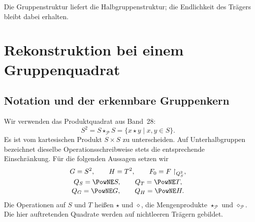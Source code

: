 \documentclass[main.tex]{subfiles}
\begin{document}


\par\noindent\begin{minipage}{\linewidth}
Die Gruppenstruktur liefert die Halbgruppenstruktur; die Endlichkeit
des Trägers bleibt dabei erhalten.
\end{minipage}\par\nopagebreak[4]
\begin{tabproofpaired}
\end{tabproofpaired}

\chapter{Rekonstruktion bei einem Gruppenquadrat}
\section{Notation und der erkennbare Gruppenkern}

Wir verwenden das Produktquadrat aus Band~28:
\[
  S^2=S\star_{\mathcal P}S=\{x\star y\mid x,y\in S\}.
\]
Es ist vom kartesischen Produkt \(S\times S\) zu unterscheiden.
Auf Unterhalbgruppen bezeichnet dieselbe Operationsschreibweise stets die
entsprechende Einschränkung. Für die folgenden Aussagen setzen wir
\[
  \begin{gathered}
    G=S^2,\qquad H=T^2,\qquad F_0=F\restriction_{Q_S^2},\\[-2pt]
    Q_S=\PowNE S,\qquad Q_T=\PowNE T,\\[-2pt]
    Q_G=\PowNE G,\qquad Q_H=\PowNE H.
  \end{gathered}
\]
Die Operationen auf \(S\) und \(T\) heißen \(\star\) und \(\diamond\),
die Mengenprodukte \(\star_{\mathcal P}\) und \(\diamond_{\mathcal P}\).
Die hier auftretenden Quadrate werden auf nichtleeren Trägern gebildet.
\end{document}
